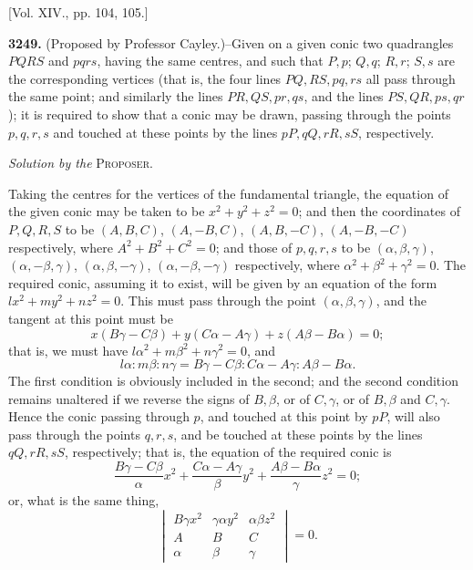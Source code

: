 \documentclass[10pt]{article}
\begin{document}
\begin{center}
[Vol. XIV., pp. 104, 105.]
\end{center}

\noindent
\textbf{3249.} (Proposed by Professor Cayley.)--Given on a given conic two
quadrangles $PQRS$ and $pqrs$, having the same centres, and such that $P,p$;
$Q,q$; $R,r$; $S,s$ are the corresponding vertices (that is, the four lines
$PQ,RS,pq,rs$ all pass through the same point; and similarly the lines
$PR,QS,pr,qs$, and the lines $PS,QR,ps,qr$); it is required to show that a
conic may be drawn, passing through the points $p,q,r,s$ and touched at these
points by the lines $pP,qQ,rR,sS$, respectively.

\begin{center}
\emph{Solution by the} \textsc{Proposer}.
\end{center}

\noindent
Taking the centres for the vertices of the fundamental triangle, the equation
of the given conic may be taken to be $x^2+y^2+z^2=0$; and then the coordinates
of $P,Q,R,S$ to be $(A,B,C)$, $(A,-B,C)$, $(A,B,-C)$, $(A,-B,-C)$ respectively,
where $A^2+B^2+C^2=0$; and those of $p,q,r,s$ to be
$(\alpha,\beta,\gamma)$, $(\alpha,-\beta,\gamma)$,
$(\alpha,\beta,-\gamma)$, $(\alpha,-\beta,-\gamma)$ respectively, where
$\alpha^2+\beta^2+\gamma^2=0$. The required conic, assuming it to exist, will
be given by an equation of the form $lx^2+my^2+nz^2=0$. This must pass through
the point $(\alpha,\beta,\gamma)$, and the tangent at this point must be
\[
x(B\gamma-C\beta)+y(C\alpha-A\gamma)+z(A\beta-B\alpha)=0;
\]
that is, we must have $l\alpha^2+m\beta^2+n\gamma^2=0$, and
\[
l\alpha:m\beta:n\gamma
=B\gamma-C\beta:C\alpha-A\gamma:A\beta-B\alpha.
\]
The first condition is obviously included in the second; and the second
condition remains unaltered if we reverse the signs of $B,\beta$, or of
$C,\gamma$, or of $B,\beta$ and $C,\gamma$. Hence the conic passing through
$p$, and touched at this point by $pP$, will also pass through the points
$q,r,s$, and be touched at these points by the lines $qQ,rR,sS$, respectively;
that is, the equation of the required conic is
\[
\frac{B\gamma-C\beta}{\alpha}x^2+
\frac{C\alpha-A\gamma}{\beta}y^2+
\frac{A\beta-B\alpha}{\gamma}z^2=0;
\]
or, what is the same thing,
\[
\begin{vmatrix}
B\gamma x^2 & \gamma\alpha y^2 & \alpha\beta z^2\\
A & B & C\\
\alpha & \beta & \gamma
\end{vmatrix}=0.
\]
\end{document}
